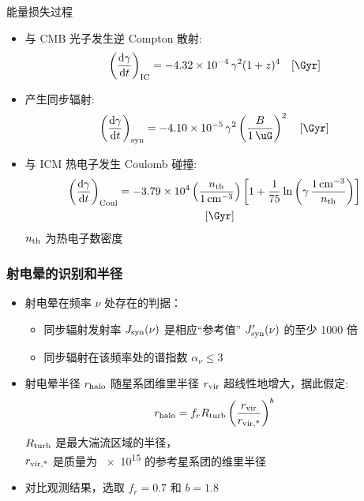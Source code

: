 \documentclass{beamer}
\begin{document}
\begin{frame}[t]
  \begin{alertblock}{能量损失过程}
    \smallskip
    \begin{itemize}
      \item 与 CMB 光子发生逆 Compton 散射:
        \begin{equation}
          \left( \diff{\gamma}{t} \right)_{\R{IC}} =
            \num{-4.32e-4} \,\gamma^2 (1+z)^4
            \quad [\si{\per\Gyr}]
        \end{equation}
      \item 产生同步辐射:
        \begin{equation}
          \left( \diff{\gamma}{t} \right)_{\R{syn}} =
            \num{-4.10e-5} \,\gamma^2
            \left( \frac{B}{\SI{1}{\uG}} \right)^2
            \quad [\si{\per\Gyr}]
        \end{equation}
      \item 与 ICM 热电子发生 Coulomb 碰撞:
        \begin{multline}
          \left( \diff{\gamma}{t} \right)_{\R{Coul}} =
            \num{-3.79e4} \left( \frac{n_{\R{th}}}{\SI{1}{\per\cm\cubed}} \right)
            \left[ 1 + \frac{1}{75} \ln \left(
              \gamma\,\frac{\SI{1}{\per\cm\cubed}}{n_{\R{th}}} \right) \right]
            \\ \quad [\si{\per\Gyr}]
        \end{multline}
        $n_{\text{th}}$ 为热电子数密度
    \end{itemize}
  \end{alertblock}
\end{frame}

\begin{frame}[subsec]
  \frametitle{射电晕的识别和半径}
  \begin{itemize}
    \item 射电晕在频率 $\nu$ 处存在的判据：
      \begin{itemize}
        \item 同步辐射发射率 $J_{\text{syn}}(\nu)$
          是相应\enquote{参考值} $J'_{\text{syn}}(\nu)$ 的至少 1000 倍
        \item 同步辐射在该频率处的谱指数 $\alpha_{\nu} \le 3$
      \end{itemize}

    \item 射电晕半径 $r_{\text{halo}}$ 随星系团维里半径 $r_{\text{vir}}$
      超线性地增大，据此假定:
      \begin{equation}
        r_{\text{halo}} = f_r R_{\text{turb}}
          \left( \frac{r_{\text{vir}}}{r_{\text{vir,*}}} \right)^b
      \end{equation}
      $R_{\text{turb}}$ 是最大湍流区域的半径，\\
      $r_{\text{vir,*}}$ 是质量为 \SI{e15}{\solarmass} 的参考星系团的维里半径
    \item 对比观测结果，选取 $f_r = 0.7$ 和 $b = 1.8$
  \end{itemize}
\end{frame}
\end{document}
